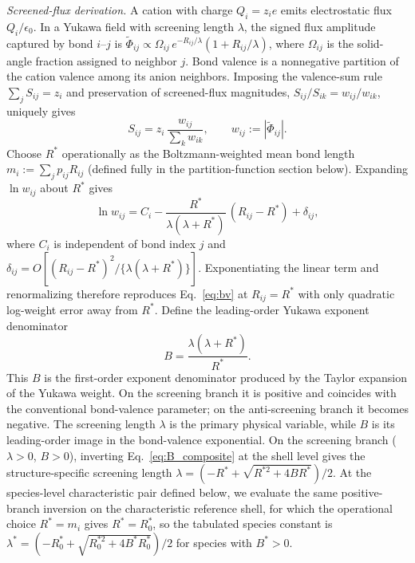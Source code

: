 \documentclass[aps,prl,twocolumn,10pt,superscriptaddress,floatfix]{revtex4-2}
\begin{document}
\emph{Screened-flux derivation.} A cation with charge $Q_i=z_i e$ emits
electrostatic flux $Q_i/\epsilon_0$.  In a Yukawa field with screening
length $\lambda$, the signed flux amplitude captured by bond $i$--$j$ is
$\widetilde\Phi_{ij}\propto\Omega_{ij}\,e^{-R_{ij}/\lambda}(1+R_{ij}/\lambda)$,
where $\Omega_{ij}$ is the solid-angle fraction assigned to neighbor $j$.
Bond valence is a nonnegative partition of the cation valence among its
anion neighbors.  Imposing the valence-sum rule $\sum_j S_{ij}=z_i$ and
preservation of screened-flux magnitudes, $S_{ij}/S_{ik}=w_{ij}/w_{ik}$,
uniquely gives
\begin{equation*}
S_{ij}=z_i\,\frac{w_{ij}}{\sum_k w_{ik}},
\qquad w_{ij}:=|\widetilde\Phi_{ij}|.
\end{equation*}
Choose $R^*$ operationally as the Boltzmann-weighted mean bond length
$m_i:=\sum_j p_{ij}R_{ij}$ (defined fully in the partition-function
section below).  Expanding $\ln w_{ij}$ about $R^*$ gives
\begin{equation}\label{eq:expansion}
\ln w_{ij}= C_i - \frac{R^*}{\lambda(\lambda+R^*)}\,(R_{ij}-R^*)+\delta_{ij},
\end{equation}
where $C_i$ is independent of bond index $j$ and
$\delta_{ij}=O[(R_{ij}-R^*)^2/\{\lambda(\lambda+R^*)\}]$.
Exponentiating the linear
term and renormalizing therefore reproduces Eq.~\eqref{eq:bv} at
$R_{ij}=R^*$ with only quadratic log-weight error away from $R^*$.  Define
the leading-order Yukawa exponent denominator
\begin{equation}\label{eq:B_composite}
B = \frac{\lambda(\lambda+R^*)}{R^*}.
\end{equation}
This $B$ is the first-order exponent denominator produced by the Taylor
expansion of the Yukawa weight.  On the screening branch it is positive
and coincides with the conventional bond-valence parameter; on the
anti-screening branch it becomes negative. The screening length $\lambda$ is the primary physical
variable, while $B$ is its leading-order image in the bond-valence
exponential.  On the screening branch ($\lambda>0$, $B>0$), inverting
Eq.~\eqref{eq:B_composite}
at the shell level gives the structure-specific screening length
$\lambda=(-R^*+\sqrt{R^{*2}+4BR^*})/2$.  At the species-level
characteristic pair defined below, we evaluate the same positive-branch
inversion on the characteristic reference shell, for which the
operational choice $R^*=m_i$ gives $R^*=R_0^*$, so the tabulated
species constant is
$\lambda^*=(-R_0^*+\sqrt{R_0^{*2}+4B^*R_0^*})/2$ for species with
$B^*>0$.
\end{document}
